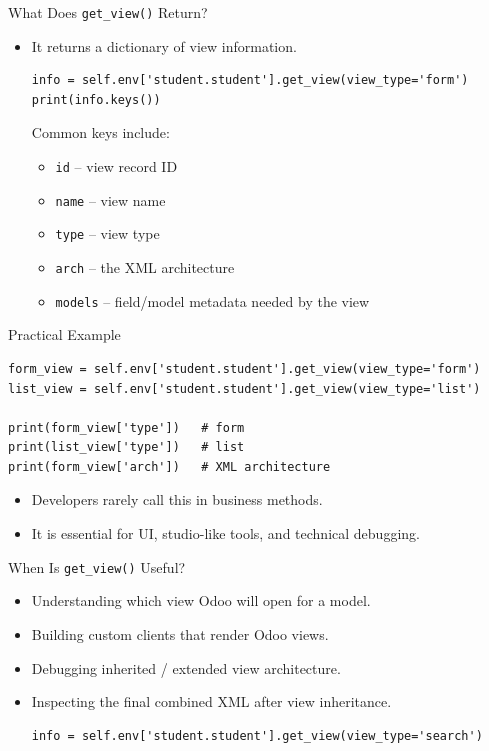 \begin{frame}[fragile]{What Does \texttt{get\_view()} Return?}
	\begin{block}{}
		\begin{itemize}
			\item It returns a dictionary of view information.
\begin{lstlisting}
info = self.env['student.student'].get_view(view_type='form')
print(info.keys())
\end{lstlisting}
			Common keys include:
			\begin{itemize}
				\item \texttt{id} -- view record ID
				\item \texttt{name} -- view name
				\item \texttt{type} -- view type
				\item \texttt{arch} -- the XML architecture
				\item \texttt{models} -- field/model metadata needed by the view
			\end{itemize}
		\end{itemize}
	\end{block}
\end{frame}

\begin{frame}[fragile]{Practical Example}
\begin{lstlisting}
form_view = self.env['student.student'].get_view(view_type='form')
list_view = self.env['student.student'].get_view(view_type='list')

print(form_view['type'])   # form
print(list_view['type'])   # list
print(form_view['arch'])   # XML architecture
\end{lstlisting}
	\begin{itemize}
		\item Developers rarely call this in business methods.
		\item It is essential for UI, studio-like tools, and technical debugging.
	\end{itemize}
\end{frame}

\begin{frame}[fragile]{When Is \texttt{get\_view()} Useful?}
	\begin{itemize}
		\item Understanding which view Odoo will open for a model.
		\item Building custom clients that render Odoo views.
		\item Debugging inherited / extended view architecture.
		\item Inspecting the final combined XML after view inheritance.
\begin{lstlisting}
info = self.env['student.student'].get_view(view_type='search')
\end{lstlisting}
	\end{itemize}
\end{frame}

